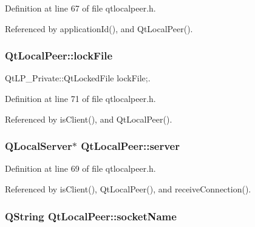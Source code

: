 Definition at line 67 of file qtlocalpeer.\-h.



Referenced by application\-Id(), and Qt\-Local\-Peer().

\hypertarget{class_qt_local_peer_ab72488160eed35c9518ef3de1e6062cf}{
\subsubsection[{lock\-File}]{ Qt\-Local\-Peer\-::lock\-File\hspace{0.3cm}{\ttfamily [protected]}}}\label{class_qt_local_peer_ab72488160eed35c9518ef3de1e6062cf}


Qt\-L\-P\-\_\-\-Private\-::\-Qt\-Locked\-File lock\-File;. 



Definition at line 71 of file qtlocalpeer.\-h.



Referenced by is\-Client(), and Qt\-Local\-Peer().

\hypertarget{class_qt_local_peer_af400ab8eb001ef4790541069a5d0e292}{
\subsubsection[{server}]{\setlength{\rightskip}{0pt plus 5cm}Q\-Local\-Server$\ast$ Qt\-Local\-Peer\-::server\hspace{0.3cm}{\ttfamily [protected]}}}\label{class_qt_local_peer_af400ab8eb001ef4790541069a5d0e292}


Definition at line 69 of file qtlocalpeer.\-h.



Referenced by is\-Client(), Qt\-Local\-Peer(), and receive\-Connection().

\hypertarget{class_qt_local_peer_a2c86a18c237bdfe4bd0565d3cc413cd8}{
\subsubsection[{socket\-Name}]{\setlength{\rightskip}{0pt plus 5cm}Q\-String Qt\-Local\-Peer\-::socket\-Name\hspace{0.3cm}{\ttfamily [protected]}}}\label{class_qt_local_peer_a2c86a18c237bdfe4bd0565d3cc413cd8}


